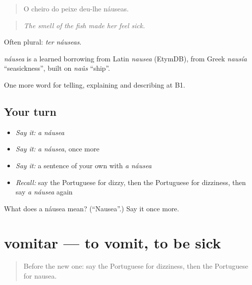 \begin{quote}
O cheiro do peixe deu-lhe náuseas.
\end{quote}

\begin{quote}
\emph{The smell of the fish made her feel sick.}
\end{quote}

Often plural: \emph{ter náuseas}.

\begin{cousinweb}
\emph{náusea} is a learned borrowing from Latin \emph{nausea} (EtymDB), from Greek \emph{nausía} \textquotedblleft{}seasickness\textquotedblright{}, built on \emph{naûs} \textquotedblleft{}ship\textquotedblright{}.
\end{cousinweb}

\begin{grammarlens}[title={What you've built}]
One more word for telling, explaining and describing at B1.
\end{grammarlens}

\subsection*{Your turn}
\begin{itemize}
\raggedright
  \item \emph{Say it:} \emph{a náusea}
  \item \emph{Say it:} \emph{a náusea}, once more
  \item \emph{Say it:} a sentence of your own with \emph{a náusea}
  \item \emph{Recall:} say the Portuguese for dizzy, then the Portuguese for dizziness, then say \emph{a náusea} again
\end{itemize}

\begin{tcolorbox}[breakable,colback=teal!4,colframe=teal!35!black,title={Before you move on}]
What does a náusea mean? (\textquotedblleft{}Nausea\textquotedblright{}.) Say it once more.
\end{tcolorbox}
\section[vomitar]{vomitar — to vomit, to be sick}

\label{lesson:PT-C484-vomitar}



\begin{quote}
Before the new one: say the Portuguese for dizziness, then the Portuguese for nausea.
\end{quote}

